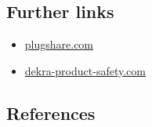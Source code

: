 \documentclass[
]{book}
\providecommand{\tightlist}{%
  \setlength{\itemsep}{0pt}\setlength{\parskip}{0pt}}
\begin{document}
\hypertarget{further-links-4}{%
\subsection*{Further links}\label{further-links-4}}

\begin{itemize}
\tightlist
\item
  \href{https://www.plugshare.com/en}{plugshare.com}
\item
  \href{https://www.dekra-product-safety.com/en/ev-charging-station-technology}{dekra-product-safety.com}
\end{itemize}

\hypertarget{references-5}{%
\subsection*{References}\label{references-5}}
\end{document}
